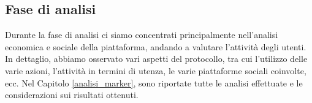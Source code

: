 \subsection{Fase di analisi}
Durante la fase di analisi ci siamo concentrati principalmente nell'analisi economica e sociale della piattaforma, andando a valutare l'attività degli utenti. In dettaglio, abbiamo osservato vari aspetti del protocollo, tra cui l'utilizzo delle varie azioni, l'attività in termini di utenza, le varie piattaforme sociali coinvolte, ecc. Nel Capitolo \ref{analisi_marker}, sono riportate tutte le analisi effettuate e le considerazioni sui risultati ottenuti.
